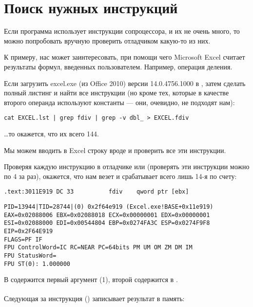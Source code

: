 \section{Поиск нужных инструкций}

Если программа использует инструкции сопроцессора, и их не очень много, 
то можно попробовать вручную проверить отладчиком какую-то из них.

\par К примеру, нас может заинтересовать, при помощи чего Microsoft Excel считает 
результаты формул, введенных пользователем. Например, операция деления.

\myindex{\GrepUsage}
Если загрузить excel.exe (из Office 2010) версии 14.0.4756.1000 в \IDA, затем сделать полный листинг 
и найти все инструкции \FDIV (но кроме тех, которые в качестве второго операнда используют константы --- они, 
очевидно, не подходят нам):

\begin{lstlisting}
cat EXCEL.lst | grep fdiv | grep -v dbl_ > EXCEL.fdiv
\end{lstlisting}

\dots то окажется, что их всего 144.

\par Мы можем вводить в Excel строку вроде  и проверить все эти инструкции.

\par Проверяя каждую инструкцию в отладчике или \tracer 
(проверять эти инструкции можно по 4 за раз), 
окажется, что нам везет и срабатывает всего лишь 14-я по счету:

\begin{lstlisting}[style=customasmx86]
.text:3011E919 DC 33          fdiv    qword ptr [ebx]
\end{lstlisting}

\begin{lstlisting}
PID=13944|TID=28744|(0) 0x2f64e919 (Excel.exe!BASE+0x11e919)
EAX=0x02088006 EBX=0x02088018 ECX=0x00000001 EDX=0x00000001
ESI=0x02088000 EDI=0x00544804 EBP=0x0274FA3C ESP=0x0274F9F8
EIP=0x2F64E919
FLAGS=PF IF
FPU ControlWord=IC RC=NEAR PC=64bits PM UM OM ZM DM IM 
FPU StatusWord=
FPU ST(0): 1.000000
\end{lstlisting}

В  содержится первый аргумент (1), второй содержится в \TT{[EBX]}.\\
\\
Следующая за \FDIV инструкция () записывает результат в память: \\

